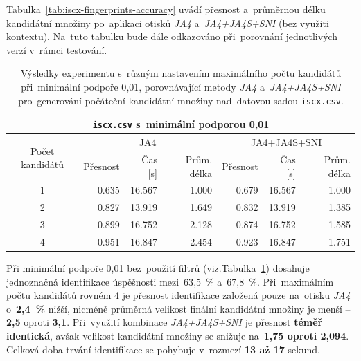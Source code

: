 Tabulka~\ref{tab:iscx-fingerprints-accuracy} uvádí přesnost a~průměrnou délku kandidátní množiny po~aplikaci otisků \textit{JA4} a~\textit{JA4+JA4S+SNI} (bez využiti kontextu). Na~tuto tabulku bude dále odkazováno při~porovnání jednotlivých verzí v~rámci testování.


\begin{table}[H]
	\centering
	\begin{tabular}{c|rrr|rrr}
		\toprule
		\multicolumn{7}{c}{\texttt{iscx.csv} s~minimální podporou 0{,}01}  \\
		\midrule
		\multirow{2}{*}{Počet kandidátů} & \multicolumn{3}{c}{JA4} & \multicolumn{3}{c}{JA4+JA4S+SNI}\\
		  & Přesnost & Čas [s] & Prům. délka & Přesnost & Čas [s] & Prům. délka \\
		\midrule
		1 & 0.635     & 16.567   & 1.000         & 0.679     & 16.567   & 1.000         \\
		2 & 0.827     & 13.919   & 1.649         & 0.832     & 13.919   & 1.385         \\
		3 & 0.899     & 16.752   & 2.128         & 0.874     & 16.752   & 1.585         \\
		4 & 0.951     & 16.847   & 2.454         & 0.923     & 16.847   & 1.751         \\
		\bottomrule
	\end{tabular}
	\caption{Výsledky experimentu s~různým nastavením maximálního počtu kandidátů při~minimální podpoře 0{,}01, porovnávající metody \textit{JA4} a~\textit{JA4+JA4S+SNI} pro~generování počáteční kandidátní množiny nad~datovou sadou \texttt{iscx.csv}.}
	\label{tab:iscx_sup_01}
\end{table}

Při minimální podpoře 0{,}01 bez~použití filtrů (viz.Tabulka~\ref{tab:iscx_sup_01}) dosahuje jednoznačná identifikace úspěšnosti mezi~63{,}5~\% a~67{,}8~\%. Při~maximálním počtu kandidátů rovném 4 je přesnost identifikace založená pouze na~otisku \textit{JA4} o~\textbf{2{,}4~\%} nižší, nicméně průměrná velikost finální kandidátní množiny je menší -- \textbf{2{,}5} oproti \textbf{3{,}1}. Při~využití kombinace \textit{JA4+JA4S+SNI} je přesnost \textbf{téměř identická}, avšak velikost kandidátní množiny se snižuje na~\textbf{1{,}75 oproti 2{,}094}. Celková doba trvání identifikace se pohybuje v~rozmezí \textbf{13 až 17} sekund.

